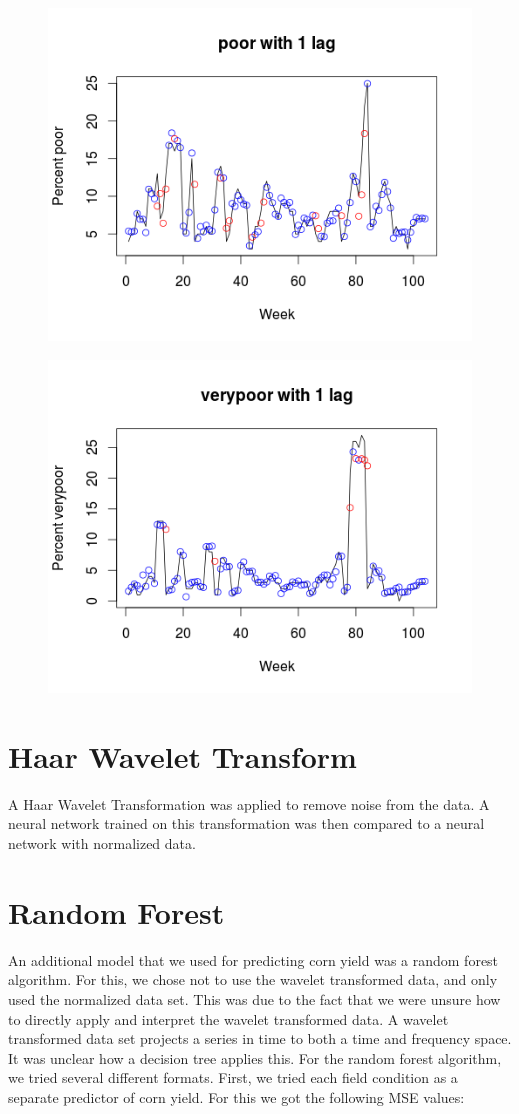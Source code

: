 \documentclass[a4paper]{apa6}
\begin{document}
\begin{center}
\begin{figure}
\caption{}
\end{figure}
\begin{figure}
\includegraphics[width=0.8\linewidth]{poorlag1.png}
\caption{}
\end{figure}
\begin{figure}
\includegraphics[width=0.8\linewidth]{verypoorlag1.png}
\caption{}
\end{figure}
\end{center}


\section*{Haar Wavelet Transform}
A Haar Wavelet Transformation was applied to remove noise from the data.  A neural network trained on this transformation was then compared to a neural network with normalized data.  

\section*{Random Forest}
An additional model that we used for predicting corn yield was a random forest algorithm. For this, we chose not to use the wavelet transformed data, and only used the normalized data set. This was due to the fact that we were unsure how to directly apply and interpret the wavelet transformed data. A wavelet transformed data set projects a series in time to both a time and frequency space. It was unclear how a decision tree applies this. For the random forest algorithm, we tried several different formats. First, we tried each field condition as a separate predictor of corn yield. For this we got the following MSE values:
\end{document}

